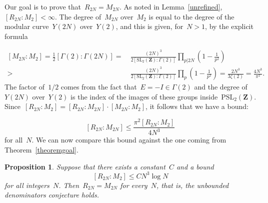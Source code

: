 \documentclass[10pt]{amsart}
\def\PSL{\mathrm{PSL}}
\def\Z{\mathbf{Z}}
\newtheorem{proposition}[subsubsection]{Proposition}
\theoremstyle{remark}
\numberwithin{equation}{subsection}
\def\numequation{\addtocounter{subsubsection}{1}\begin{equation}}
\def\SL{\mathrm{SL}}
\begin{document}
Our goal is to prove that~$R_{2N}= M_{2N}$. 
As noted in Lemma~\ref{unrefined}, $[R_{2N}:M_2] < \infty$. 
The degree of~$M_{2N}$ over~$M_2$ is equal to the degree of the modular curve~$Y(2N)$ over~$Y(2)$, and this is given,
for~$N > 1$, 
by the explicit formula
\numequation
\label{zeta2}
\begin{aligned}
[M_{2N}:M_2] =
\frac{1}{2}[\Gamma(2):\Gamma(2N)] = & \  \frac{(2N)^3}{2[\SL_2(\Z):\Gamma(2)]} \prod_{p|2N} \left(1 - \frac{1}{p^2} \right)  \\
> & \  \frac{(2N)^3}{2[\SL_2(\Z):\Gamma(2)]} \prod_{p} \left(1 - \frac{1}{p^2} \right) = \frac{2 N^3}{3 \zeta(2)}
= \frac{4 N^3}{\pi^2}. \end{aligned}
\end{equation}
The factor of~$1/2$ comes from the fact that~$E = -I \in \Gamma(2)$ and the degree of~$Y(2N)$ over~$Y(2)$
 is the index of the images of these groups inside~$\PSL_2(\Z)$.
Since~$[R_{2N}:M_2] = [R_{2N}:M_{2N}] \cdot [M_{2N}:M_2]$, 
it follows that we have a bound:
\numequation
\label{goal}
[R_{2N}:M_{2N}] \le  \frac{\pi^2[R_{2N}:M_2]}{4 N^3}
\end{equation}
for all~$N$.  We can now compare this bound against the one
coming from Theorem~\ref{theoremgoal}.


\begin{proposition} \label{selfcontained}
Suppose that there exists a constant~$C$ and a bound
$$[R_{2N}:M_2] \le C N^3 \log N$$
for all  integers~$N$. Then~$R_{2N} = M_{2N}$ for every~$N$, that is,
the unbounded denominators conjecture holds.
\end{proposition}
\end{document}
